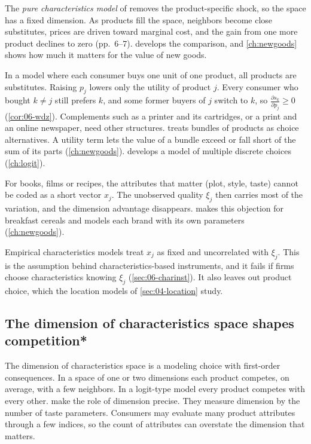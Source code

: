 The \emph{pure characteristics model} of \citet{BerryPakes2007} removes the product-specific shock, so the space
has a fixed dimension. As products fill the space, neighbors become close substitutes, prices are driven toward
marginal cost, and the gain from one more product declines to zero (pp.~6--7).  develops the
comparison, and \cref{ch:newgoods} shows how much it matters for the value of new goods.

In a model where each consumer buys one unit of one product, all products are substitutes. Raising $p_j$ lowers
only the utility of product $j$. Every consumer who bought $k \neq j$ still prefers $k$, and some former buyers of
$j$ switch to $k$, so $\frac{\partial s_k}{\partial p_j} \geq 0$ (\cref{cor:06-wdz}). Complements such as a printer
and its cartridges, or a print and an online newspaper, need other structures. \citet{Gentzkow2007} treats bundles
of products as choice alternatives. A utility term lets the value of a bundle exceed or fall short of the sum of
its parts (\cref{ch:newgoods}). \citet{Hendel1999} develops a model of multiple discrete choices (\cref{ch:logit}).

For books, films or recipes, the attributes that matter (plot, style, taste) cannot be coded as a short vector
$x_j$. The unobserved quality $\xi_j$ then carries most of the variation, and the dimension advantage disappears.
\citet[sec.~5.5]{Hausman1997} makes this objection for breakfast cereals and models each brand with its own
parameters (\cref{ch:newgoods}).

Empirical characteristics models treat $x_j$ as fixed and uncorrelated with $\xi_j$. This is the assumption behind
characteristics-based instruments, and it fails if firms choose characteristics knowing $\xi_j$
(\cref{sec:06-charinst}). It also leaves out product choice, which the location models of \cref{sec:04-location}
study.

\subsection{The dimension of characteristics space shapes competition*}\label{sec:04-spaces-dimension}

The dimension of characteristics space is a modeling choice with first-order consequences. In a space of one or
two dimensions each product competes, on average, with a few neighbors. In a logit-type model every product competes with every other.
\citet[Section~7]{CaplinNalebuff1991} make the role of dimension precise. They measure dimension by the number of
taste parameters. Consumers may evaluate many product attributes through a few indices, so the count of attributes
can overstate the dimension that matters.


